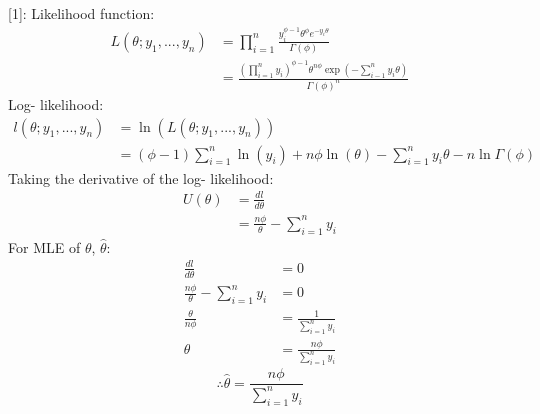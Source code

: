 \documentclass[a4paper]{article}
\begin{document}
    \subsection{}
        [1]: \newline
        Likelihood function:
            \begin{equation*}
                \begin{split}
                    L(\theta; y_1, ... , y_n) &= \prod_{i=1}^n \frac{y_i^{\phi-1} \theta^\phi e^{-y_i\theta}}{\Gamma(\phi)}\\
                    &= \frac{\left(\prod_{i=1}^n y_i\right)^{\phi-1} \theta^{n\phi} \exp\left(-\sum_{i-1}^n y_i\theta\right)}{{\Gamma(\phi)}^n}
                \end{split}
            \end{equation*}
        Log- likelihood:
            \begin{equation*}
                \begin{split}
                    l(\theta;y_1, ... , y_n) &= \ln\left(L(\theta; y_1, ... , y_n)\right)\\
                    &= (\phi -1)\sum_{i=1}^n\ln(y_i) + n\phi\ln(\theta) - \sum_{i=1}^n y_i\theta - n\ln\Gamma(\phi)
                \end{split}
            \end{equation*}
        Taking the derivative of the log- likelihood:
            \begin{equation*}
                \begin{split}
                    U(\theta) &= \frac{dl}{d\theta}\\
                    &= \frac{n\phi}{\theta} - \sum_{i=1}^n y_i
                \end{split}
            \end{equation*}
        For MLE of \(\theta\), \(\hat{\theta}\):
            \begin{equation*}
                \begin{split}
                    \frac{dl}{d\theta} &= 0\\
                    \frac{n\phi}{\theta} - \sum_{i=1}^n y_i &= 0\\
                    \frac{\theta}{n\phi} &= \frac{1}{\sum_{i=1}^n y_i}\\
                    \theta &= \frac{n\phi}{\sum_{i=1}^n y_i}
                \end{split}
            \end{equation*}
        \[\therefore \hat{\theta} = \frac{n\phi}{\sum_{i=1}^n y_i}\]
        
\end{document}
